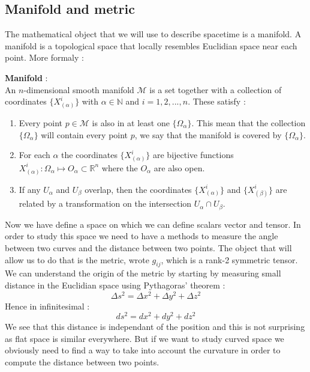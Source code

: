 \documentclass[a4paper,12pt]{article}
\theoremstyle{definition}
\begin{document}
\subsection{Manifold and metric}
The mathematical object that we will use to describe spacetime is a manifold.
A manifold is a topological space that locally resembles Euclidian space near each point.
More formaly :
\begin{definition}
	\textbf{Manifold} :\\
	An $n$-dimensional smooth manifold $\mathcal{M}$ is a set together with a collection of coordinates $\{ X^i_{(\alpha)}\}$
	with $\alpha \in \mathbb{N}$ and $i=1,2,...,n$. These satisfy :
	\begin{enumerate}
		\item Every point $p\in\mathcal{M}$ is also in at least one $\{\Omega_\alpha\}$.
		This mean that the collection $\{\Omega_\alpha\}$ will contain every point $p$,
		we say that the manifold is covered by $\{\Omega_\alpha\}$.
		\item For each $\alpha$ the coordinates $\{ X^i_{(\alpha)}\}$ are bijective functions $X^i_{(\alpha)}:\Omega_\alpha \mapsto O_\alpha \subset \mathbb{R}^n$
		where the $O_\alpha$ are also open.
		\item If any $U_\alpha$ and $U_\beta$ overlap, then the coordinates $\{ X^i_{(\alpha)}\}$ and $\{ X^i_{(\beta)}\}$
		are related by a  transformation on the intersection $U_\alpha \cap U_\beta$.
	\end{enumerate}
\end{definition}
Now we have define a space on which we can define scalars vector and tensor.
In order to study this space we need to have a methods to measure the angle between two curves and the distance between two points.
The object that will allow us to do that is the metric, wrote $g_{ij}$, which is a rank-2 symmetric tensor.
We can understand the origin of the metric by starting by measuring small distance in the Euclidian space using Pythagoras' theorem :
\begin{equation}
	\Delta s^2= \Delta x^2 + \Delta y^2 + \Delta z^2
\end{equation}
Hence in infinitesimal :
\begin{equation}\label{dist}
	ds^2= dx^2 + dy^2 + dz^2
\end{equation}
We see that this distance is independant of the position and this is not surprising as flat space is similar everywhere.
But if we want to study curved space we obviously need to find a way to take into account the curvature in order to compute the distance between two points.\\
\end{document}
